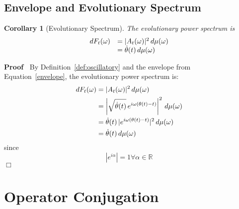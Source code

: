 \documentclass{article}
\newenvironment{proof}{\noindent\textbf{Proof\ }}{\hspace*{\fill}$\Box$\medskip}
\newtheorem{corollary}{Corollary}
\begin{document}
\subsection{Envelope and Evolutionary Spectrum}

\begin{corollary}
[Evolutionary Spectrum]\label{cor:evolving_spec} The evolutionary power
spectrum is
\begin{equation}
\label{eq:evolutionary_spec} \begin{array}{ll}
dF_t (\omega) & = \lvert A_t (\omega) \rvert^2 \hspace{0.17em} d \mu
(\omega)\\
& = \dot{\theta} (t) \hspace{0.17em} d \mu (\omega)
\end{array}
\end{equation}
\end{corollary}

\begin{proof}
By Definition~\ref{def:oscillatory} and the envelope from
Equation~\ref{envelope}, the evolutionary power spectrum is:
\begin{align}
dF_t (\omega) & = \lvert A_t (\omega) \rvert^2 \hspace{0.17em} d \mu
(\omega) \\
& = \left| \sqrt{\dot{\theta} (t)} \hspace{0.17em} e^{i \omega (\theta
(t) - t)} \right|^2 \hspace{0.17em} d \mu (\omega) \\
& = \dot{\theta} (t) \hspace{0.17em} | e^{i \omega (\theta (t) - t)} |^2
\hspace{0.17em} d \mu (\omega) \\
& = \dot{\theta} (t) \hspace{0.17em} d \mu (\omega)
\end{align}
since
\begin{equation}
|e^{i \alpha} | = 1 \forall \alpha \in \mathbb{R}
\end{equation}
\end{proof}

\section{Operator Conjugation}\label{sec:conjugation}
\end{document}
